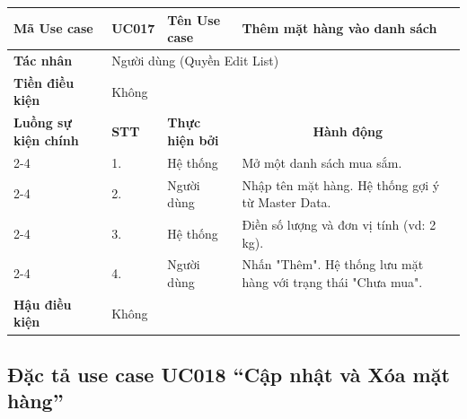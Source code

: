 \documentclass[../main.tex]{subfiles}
\begin{document}
\begin{longtable}{|p{2.7cm}|p{0.8cm}|p{2.6cm}|p{7.3cm}|}
\hline
\cellcolor[HTML]{D5F5E3}\textbf{Mã Use case} & \multicolumn{1}{l|}{UC017} & \cellcolor[HTML]{D5F5E3}\textbf{Tên Use case} & Thêm mặt hàng vào danh sách \\ \hline
\cellcolor[HTML]{D5F5E3}\textbf{Tác nhân} & \multicolumn{3}{p{10.7cm}|}{Người dùng (Quyền Edit List)} \\ \hline
\cellcolor[HTML]{D5F5E3}\textbf{Tiền điều kiện} & \multicolumn{3}{p{10.7cm}|}{Không} \\ \hline

\cellcolor[HTML]{D5F5E3}\textbf{Luồng sự kiện chính} & \cellcolor[HTML]{FDEBD0}\textbf{STT} & \cellcolor[HTML]{FDEBD0}\textbf{Thực hiện bởi} & \multicolumn{1}{c|}{\cellcolor[HTML]{FDEBD0}\textbf{Hành động}} \\ \cline{2-4} 
\cellcolor[HTML]{D5F5E3} & 1. & Hệ thống & Mở một danh sách mua sắm. \\ \cline{2-4} 
\cellcolor[HTML]{D5F5E3} & 2. & Người dùng & Nhập tên mặt hàng. Hệ thống gợi ý từ Master Data. \\ \cline{2-4} 
\cellcolor[HTML]{D5F5E3} & 3. & Hệ thống & Điền số lượng và đơn vị tính (vd: 2 kg). \\ \cline{2-4} 
\cellcolor[HTML]{D5F5E3} & 4. & Người dùng & Nhấn "Thêm". Hệ thống lưu mặt hàng với trạng thái "Chưa mua". \\ \hline

\cellcolor[HTML]{D5F5E3}\textbf{Hậu điều kiện} & \multicolumn{3}{p{10.7cm}|}{Không} \\ \hline
\end{longtable}
\endgroup

\subsection{Đặc tả use case UC018 ``Cập nhật và Xóa mặt hàng''}
\vspace{0.5cm}

\begingroup
\renewcommand{\arraystretch}{1.5}
\end{document}
